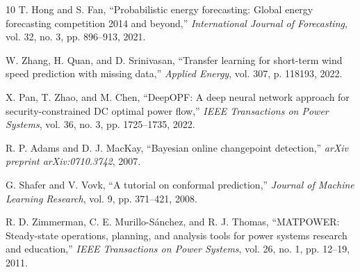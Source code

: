 \documentclass[journal]{IEEEtran}
\begin{document}
\begin{thebibliography}{10}
T. Hong and S. Fan, ``Probabilistic energy forecasting: Global energy forecasting competition 2014 and beyond,'' \textit{International Journal of Forecasting}, vol. 32, no. 3, pp. 896--913, 2021.

W. Zhang, H. Quan, and D. Srinivasan, ``Transfer learning for short-term wind speed prediction with missing data,'' \textit{Applied Energy}, vol. 307, p. 118193, 2022.

X. Pan, T. Zhao, and M. Chen, ``DeepOPF: A deep neural network approach for  security-constrained DC optimal power flow,'' \textit{IEEE Transactions on Power Systems}, vol. 36, no. 3, pp. 1725--1735, 2022.

R. P. Adams and D. J. MacKay, ``Bayesian online changepoint detection,'' \textit{arXiv preprint arXiv:0710.3742}, 2007.

G. Shafer and V. Vovk, ``A tutorial on conformal prediction,'' \textit{Journal of Machine Learning Research}, vol. 9, pp. 371--421, 2008.

R. D. Zimmerman, C. E. Murillo-Sánchez, and R. J. Thomas, ``MATPOWER: Steady-state operations, planning, and analysis tools for power systems research and education,'' \textit{IEEE Transactions on Power Systems}, vol. 26, no. 1, pp. 12--19, 2011.

\end{thebibliography}
\end{document}
